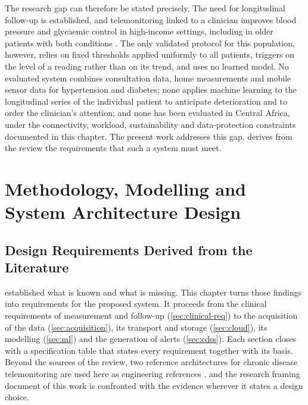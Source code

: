 \documentclass[12pt,a4paper,oneside]{report}
\begin{document}
The research gap can therefore be stated precisely. The need for longitudinal follow-up is established, and telemonitoring linked to a clinician improves blood pressure and glycaemic control in high-income settings, including in older patients with both conditions \parencite{mihevc2025}. The only validated protocol for this population, however, relies on fixed thresholds applied uniformly to all patients, triggers on the level of a reading rather than on its trend, and uses no learned model. No evaluated system combines consultation data, home measurements and mobile sensor data for hypertension and diabetes; none applies machine learning to the longitudinal series of the individual patient to anticipate deterioration and to order the clinician's attention; and none has been evaluated in Central Africa, under the connectivity, workload, sustainability and data-protection constraints documented in this chapter. The present work addresses this gap.  derives from the review the requirements that such a system must meet.


\part{Methodology, Modelling and System Architecture Design}

\chapter{Design Requirements Derived from the Literature}\label{ch:techsota}

 established what is known and what is missing. This chapter turns those findings into requirements for the proposed system. It proceeds from the clinical requirements of measurement and follow-up (\cref{sec:clinical-req}) to the acquisition of the data (\cref{sec:acquisition}), its transport and storage (\cref{sec:cloud}), its modelling (\cref{sec:ml}) and the generation of alerts (\cref{sec:cdss}). Each section closes with a specification table that states every requirement together with its basis. Beyond the sources of the review, two reference architectures for chronic disease telemonitoring are used here as engineering references \parencite{yazdani2018,mucchi2021}, and the research framing document of this work is confronted with the evidence wherever it states a design choice.
\end{document}
